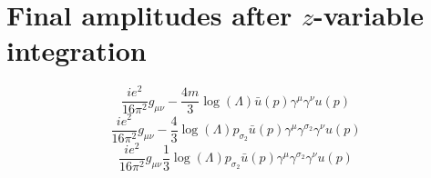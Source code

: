 \section*{Final amplitudes after $z$-variable integration}
\begin{dmath}\frac{i e^{2}}{16 \pi^{2}}g_{ \mu \nu }- \frac{4 m}{3} \log{\left (\Lambda \right )} { \bar{u}(p) } { \gamma^{ \mu } } { \gamma^{ \nu } } u({ p })\end{dmath}
\begin{dmath}\frac{i e^{2}}{16 \pi^{2}}g_{ \mu \nu }- \frac{4}{3} \log{\left (\Lambda \right )} { { p }_{ \sigma_2 } } { \bar{u}(p) } { \gamma^{ \mu } } { \gamma^{ \sigma_2 } } { \gamma^{ \nu } } u({ p })\end{dmath}
\begin{dmath}\frac{i e^{2}}{16 \pi^{2}}g_{ \mu \nu }\frac{1}{3} \log{\left (\Lambda \right )} { { p }_{ \sigma_2 } } { \bar{u}(p) } { \gamma^{ \mu } } { \gamma^{ \sigma_2 } } { \gamma^{ \nu } } u({ p })\end{dmath}
